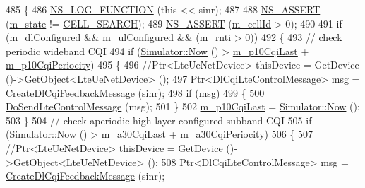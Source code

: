 \begin{DoxyCode}
485 \{
486   \hyperlink{log-macros-disabled_8h_a90b90d5bad1f39cb1b64923ea94c0761}{NS\_LOG\_FUNCTION} (\textcolor{keyword}{this} << sinr);
487 
488   \hyperlink{assert_8h_a6dccdb0de9b252f60088ce281c49d052}{NS\_ASSERT} (\hyperlink{classns3_1_1LteUePhy_a5a8bad2a7221da5f87727d53d58b481f}{m\_state} != \hyperlink{classns3_1_1LteUePhy_ae5118801f100c494663f0ca1e942aa31a5da02705337a130a4e573ae825e8ef70}{CELL\_SEARCH});
489   \hyperlink{assert_8h_a6dccdb0de9b252f60088ce281c49d052}{NS\_ASSERT} (\hyperlink{classns3_1_1LtePhy_ac53d10d27f1bde64807a3ff366662787}{m\_cellId} > 0);
490 
491   \textcolor{keywordflow}{if} (\hyperlink{classns3_1_1LteUePhy_a2ec4449da14656cfde833329523aa1bf}{m\_dlConfigured} && \hyperlink{classns3_1_1LteUePhy_ac90075a25fb13b52d70c1937cf83dd56}{m\_ulConfigured} && (\hyperlink{classns3_1_1LteUePhy_a887b5dc4e246a308cd09127b64ed8fac}{m\_rnti} > 0))
492     \{
493       \textcolor{comment}{// check periodic wideband CQI}
494       \textcolor{keywordflow}{if} (\hyperlink{classns3_1_1Simulator_ac3178fa975b419f7875e7105be122800}{Simulator::Now} () > \hyperlink{classns3_1_1LteUePhy_a360a0a07b343bf1370c5bd99d31dcd2a}{m\_p10CqiLast} + 
      \hyperlink{classns3_1_1LteUePhy_a43fdf08302e7659a495f320c95974c93}{m\_p10CqiPeriocity})
495         \{
496           \textcolor{comment}{//Ptr<LteUeNetDevice> thisDevice = GetDevice ()->GetObject<LteUeNetDevice> ();}
497           Ptr<DlCqiLteControlMessage> msg = \hyperlink{classns3_1_1LteUePhy_aaf8183f2c12925d6aa950a4b826a1242}{CreateDlCqiFeedbackMessage} (sinr);
498           \textcolor{keywordflow}{if} (msg)
499             \{
500               \hyperlink{classns3_1_1LteUePhy_aec15b282a5036f328c1e8ca6222b6b13}{DoSendLteControlMessage} (msg);
501             \}
502           \hyperlink{classns3_1_1LteUePhy_a360a0a07b343bf1370c5bd99d31dcd2a}{m\_p10CqiLast} = \hyperlink{classns3_1_1Simulator_ac3178fa975b419f7875e7105be122800}{Simulator::Now} ();
503         \}
504       \textcolor{comment}{// check aperiodic high-layer configured subband CQI}
505       \textcolor{keywordflow}{if}  (\hyperlink{classns3_1_1Simulator_ac3178fa975b419f7875e7105be122800}{Simulator::Now} () > \hyperlink{classns3_1_1LteUePhy_a912b9e3767497522b16d68e3602ec0a3}{m\_a30CqiLast} + 
      \hyperlink{classns3_1_1LteUePhy_a154d2c8025b353d563bf4ed40045536f}{m\_a30CqiPeriocity})
506         \{
507           \textcolor{comment}{//Ptr<LteUeNetDevice> thisDevice = GetDevice ()->GetObject<LteUeNetDevice> ();}
508           Ptr<DlCqiLteControlMessage> msg = \hyperlink{classns3_1_1LteUePhy_aaf8183f2c12925d6aa950a4b826a1242}{CreateDlCqiFeedbackMessage} (sinr);

\end{DoxyCode}

